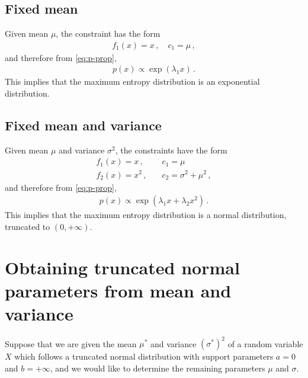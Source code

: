 \documentclass{article}
\begin{document}
\subsection*{Fixed mean}
%
Given mean $\mu$, the constraint has the form
\begin{align*}
	f_1(x) = x \,, \quad c_1 = \mu \,,
\end{align*}
%
and therefore from \eqref{eq:p-prop},
%
\begin{align*}
	p(x) \propto \exp\left(\lambda_1 x \right) \,.
\end{align*}
%
This implies that the maximum entropy distribution
is an exponential distribution.
%
\subsection*{Fixed mean and variance}
%
Given mean $\mu$ and variance $\sigma ^ 2$, the constraints have the form
\begin{align*}
	f_1(x) = x \,, &\quad c_1 = \mu \\
	f_2(x) = x ^ 2 \,, &\quad c_2 = \sigma ^ 2 + \mu ^ 2 \,,
\end{align*}
%
and therefore from \eqref{eq:p-prop},
%
\begin{align*}
	p(x) \propto \exp\left(\lambda_1 x + \lambda_2 x ^ 2\right) \,.
\end{align*}
%
This implies that the maximum entropy distribution is a normal distribution,
truncated to $(0, +\infty)$.
%
\section{Obtaining truncated normal parameters from mean and variance}
\label{section:tn-invert}
%

%
Suppose that we are given the mean $\mu^*$ and variance $(\sigma^*) ^ 2$
of a random variable $X$ which follows a truncated normal distribution
with support parameters $a = 0$ and $b = +\infty$,
and we would like to determine the remaining parameters $\mu$ and $\sigma$.
\end{document}
